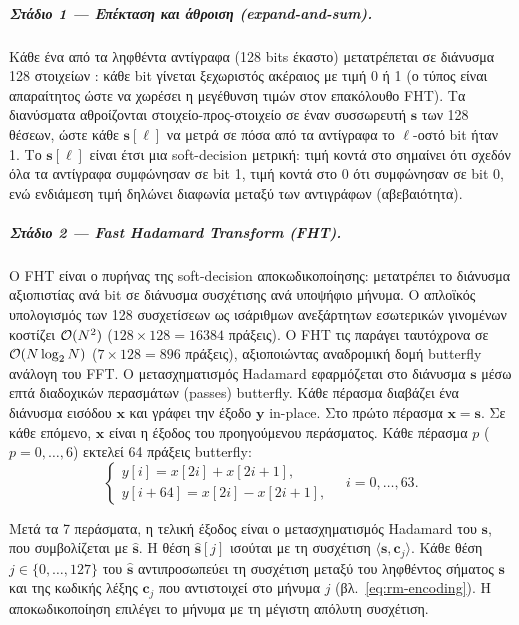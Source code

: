 \subparagraph{Στάδιο 1 — Επέκταση και άθροιση (expand-and-sum).}
Κάθε ένα από τα  ληφθέντα αντίγραφα (128 bits έκαστο)
μετατρέπεται σε διάνυσμα 128 στοιχείων : κάθε bit γίνεται ξεχωριστός ακέραιος με 
τιμή 0 ή 1 (ο τύπος  είναι απαραίτητος ώστε να χωρέσει η μεγέθυνση τιμών στον επακόλουθο FHT). 
Τα διανύσματα αθροίζονται στοιχείο-προς-στοιχείο σε έναν συσσωρευτή $\mathbf{s}$ των 128
θέσεων, ώστε κάθε $\mathbf{s}[\ell]$ να μετρά σε πόσα από τα  αντίγραφα
το $\ell$-οστό bit ήταν 1. Το $\mathbf{s}[\ell]$ είναι έτσι μια soft-decision μετρική:
τιμή κοντά στο  σημαίνει ότι σχεδόν όλα τα αντίγραφα συμφώνησαν σε bit 1,
τιμή κοντά στο 0 ότι συμφώνησαν σε bit 0, ενώ ενδιάμεση τιμή δηλώνει διαφωνία
μεταξύ των αντιγράφων (αβεβαιότητα).


\subparagraph{Στάδιο 2 — Fast Hadamard Transform (FHT).}
Ο FHT είναι ο πυρήνας της soft-decision αποκωδικοποίησης: μετατρέπει το διάνυσμα αξιοπιστίας ανά bit σε διάνυσμα συσχέτισης ανά υποψήφιο μήνυμα. Ο απλοϊκός υπολογισμός των 128 συσχετίσεων ως ισάριθμων ανεξάρτητων εσωτερικών γινομένων κοστίζει $\mathcal{O}(N^2)$ ($128 \times 128 = \num{16384}$ πράξεις). Ο FHT τις παράγει ταυτόχρονα σε $\mathcal{O}(N \log_2 N)$ ($7 \times 128 = \num{896}$ πράξεις), αξιοποιώντας αναδρομική δομή butterfly ανάλογη του FFT.
Ο μετασχηματισμός Hadamard εφαρμόζεται στο διάνυσμα $\mathbf{s}$ μέσω
επτά διαδοχικών περασμάτων (passes) butterfly. Κάθε πέρασμα διαβάζει ένα
διάνυσμα εισόδου $\mathbf{x}$ και γράφει την έξοδο $\mathbf{y}$ in-place. Στο
πρώτο πέρασμα $\mathbf{x} = \mathbf{s}$. Σε κάθε επόμενο, $\mathbf{x}$ είναι η
έξοδος του προηγούμενου περάσματος. Κάθε πέρασμα $p$ ($p = 0, \ldots, 6$) εκτελεί 64 πράξεις butterfly:
\begin{equation}\label{eq:fht-butterfly}
  \begin{cases}
    y[i] = x[2i] + x[2i+1], \\
    y[i+64] = x[2i] - x[2i+1],
  \end{cases}
  \quad i = 0, \ldots, 63.
\end{equation}

Μετά τα 7 περάσματα, η τελική έξοδος είναι ο μετασχηματισμός Hadamard του $\mathbf{s}$, που συμβολίζεται με $\hat{\mathbf{s}}$. 
Η θέση $\hat{\mathbf{s}}[j]$ ισούται με τη συσχέτιση $\langle \mathbf{s}, \mathbf{c}_j \rangle$. Κάθε θέση $j \in \{0, \ldots, 127\}$ 
του $\hat{\mathbf{s}}$ αντιπροσωπεύει τη συσχέτιση μεταξύ του ληφθέντος σήματος $\mathbf{s}$ και της κωδικής λέξης $\mathbf{c}_j$ που 
αντιστοιχεί στο μήνυμα $j$ (βλ.\ \cref{eq:rm-encoding}). Η αποκωδικοποίηση επιλέγει το μήνυμα με τη μέγιστη απόλυτη συσχέτιση.

